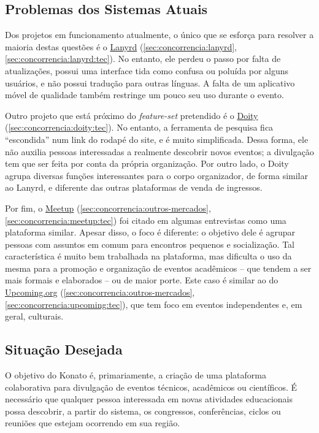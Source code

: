 \documentclass[12pt,a4paper,twoside,hyphens,english,brazil]{abntex2}
\begin{document}
\subsection{Problemas dos Sistemas Atuais}
Dos projetos em funcionamento atualmente, o único que se esforça para resolver a maioria destas questões é o \underline{Lanyrd} (\autoref{sec:concorrencia:lanyrd}, \autoref{sec:concorrencia:lanyrd:tec}). No entanto, ele perdeu o passo por falta de atualizações, possui uma interface tida como confusa ou poluída por alguns usuários, e não possui tradução para outras línguas. A falta de um aplicativo móvel de qualidade também restringe um pouco seu uso durante o evento.

Outro projeto que está próximo do \emph{feature-set} pretendido é o \underline{Doity} (\autoref{sec:concorrencia:doity:tec}). No entanto, a ferramenta de pesquisa fica ``escondida'' num link do rodapé do site, e é muito simplificada. Dessa forma, ele não auxilia pessoas interessadas a realmente descobrir novos eventos; a divulgação tem que ser feita por conta da própria organização. Por outro lado, o Doity agrupa diversas funções interessantes para o corpo organizador, de forma similar ao Lanyrd, e diferente das outras plataformas de venda de ingressos.

Por fim, o \underline{Meetup} (\autoref{sec:concorrencia:outros-mercados}, \autoref{sec:concorrencia:meetup:tec}) foi citado em algumas entrevistas como uma plataforma similar. Apesar disso, o foco é diferente: o objetivo dele é agrupar pessoas com assuntos em comum para encontros pequenos e socialização. Tal característica é muito bem trabalhada na plataforma, mas dificulta o uso da mesma para a promoção e organização de eventos acadêmicos -- que tendem a ser mais formais e elaborados -- ou de maior porte. Este caso é similar ao do \underline{Upcoming.org} (\autoref{sec:concorrencia:outros-mercados}, \autoref{sec:concorrencia:upcoming:tec}), que tem foco em eventos independentes e, em geral, culturais.

\subsection{Situação Desejada}
O objetivo do Konato é, primariamente, a criação de uma plataforma colaborativa para divulgação de eventos técnicos, acadêmicos ou científicos. É necessário que qualquer pessoa interessada em novas atividades educacionais possa descobrir, a partir do sistema, os congressos, conferências, ciclos ou reuniões que estejam ocorrendo em sua região.
\end{document}
